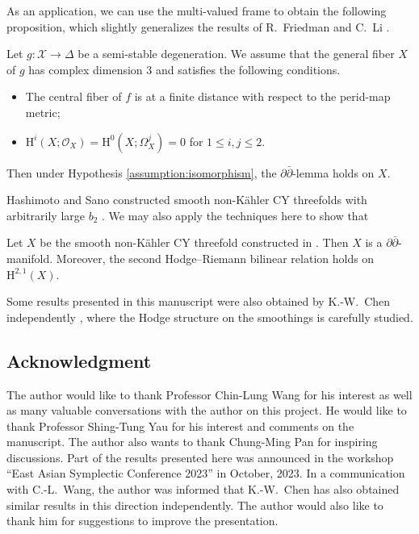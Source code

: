 As an application, we can use the multi-valued frame to obtain
the following proposition, which slightly generalizes the results of R.~Friedman
\cite{2019-Friedman-the-ddbar-lemma-for-general-clemens-manifolds} and
C.~Li \cite{2022-Li-polarized-hodge-structures-for-clemens-manifolds}.
\begin{proposition}[= Corollary \ref{cor:finite-distance-ddbar}]
Let \(g\colon\mathcal{X}\to\Delta\) be a semi-stable degeneration.
We assume that
the general fiber \(X\) of \(g\) has 
complex dimension \(3\) and satisfies the following conditions.
\begin{itemize}
\item The central fiber of \(f\) is at a finite distance with respect to
the perid-map metric;
\item \(\mathrm{H}^{i}(X;\mathcal{O}_{X})=\mathrm{H}^{0}(X;\Omega_{X}^{j})=0\)
for \(1\le i,j\le 2\).
\end{itemize}
Then under Hypothesis \ref{assumption:isomorphism}, the \(\partial\bar{\partial}\)-lemma holds on \(X\).
\end{proposition}

Hashimoto and Sano constructed smooth non-K\"{a}hler CY threefolds with arbitrarily large
\(b_{2}\) \cite{2023-Hashimoto-Sano-examples-of-non-kahler-calabi-yau-3-folds-with-arbitrarily-large-b2}. 
We may also apply the techniques here to show that
\begin{proposition}[= Theorem \ref{thm:hs-example-ddbar} and Theorem \ref{thm:hs-example-polarized}]
Let \(X\) be the smooth non-K\"{a}hler CY threefold constructed in 
\cite{2023-Hashimoto-Sano-examples-of-non-kahler-calabi-yau-3-folds-with-arbitrarily-large-b2}.
Then \(X\) is a \(\partial\bar{\partial}\)-manifold. Moreover, the second Hodge--Riemann
bilinear relation holds on \(\mathrm{H}^{2,1}(X)\).
\end{proposition}

\begin{remark}
Some results presented in this manuscript were also obtained by K.-W.~Chen independently
\cite{2024-Chen}, where the Hodge structure on the smoothings is carefully studied.
\end{remark}

\subsection*{Acknowledgment}
The author would like to thank Professor Chin-Lung Wang for his interest as well as
many valuable conversations with the author on this project. 
He would like to thank Professor Shing-Tung Yau for his interest and comments on 
the manuscript. The author 
also wants to thank 
Chung-Ming Pan for inspiring discussions. Part of the results presented here
was announced in the workshop ``East Asian Symplectic Conference 2023''
in October, 2023. In a communication with C.-L.~Wang, the author was informed that K.-W.~Chen
has also obtained similar results in this direction independently. The author would also like
to thank him for suggestions to improve the presentation.

